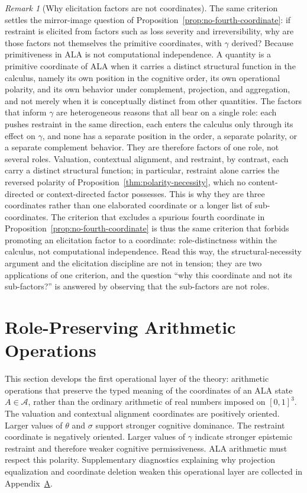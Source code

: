 \documentclass[reqno,final]{amsart}
\theoremstyle{definition}
\theoremstyle{plain}
\theoremstyle{remark}
\newtheorem{remark}{Remark}
\providecommand{\cA}{\mathcal{A}}
\begin{document}
\begin{remark}[Why elicitation factors are not coordinates]
\label{rem:factors-not-coordinates}
The same criterion settles the mirror-image question of Proposition~\ref{prop:no-fourth-coordinate}: if restraint is elicited from factors such as loss severity and irreversibility, why are those factors not themselves the primitive coordinates, with \(\gamma\) derived? Because primitiveness in ALA is not computational independence. A quantity is a primitive coordinate of ALA when it carries a distinct structural function in the calculus, namely its own position in the cognitive order, its own operational polarity, and its own behavior under complement, projection, and aggregation, and not merely when it is conceptually distinct from other quantities. The factors that inform \(\gamma\) are heterogeneous reasons that all bear on a single role: each pushes restraint in the same direction, each enters the calculus only through its effect on \(\gamma\), and none has a separate position in the order, a separate polarity, or a separate complement behavior. They are therefore factors of one role, not several roles. Valuation, contextual alignment, and restraint, by contrast, each carry a distinct structural function; in particular, restraint alone carries the reversed polarity of Proposition~\ref{thm:polarity-necessity}, which no content-directed or context-directed factor possesses. This is why they are three coordinates rather than one elaborated coordinate or a longer list of sub-coordinates. The criterion that excludes a spurious fourth coordinate in Proposition~\ref{prop:no-fourth-coordinate} is thus the same criterion that forbids promoting an elicitation factor to a coordinate: role-distinctness within the calculus, not computational independence. Read this way, the structural-necessity argument and the elicitation discipline are not in tension; they are two applications of one criterion, and the question ``why this coordinate and not its sub-factors?'' is answered by observing that the sub-factors are not roles.
\end{remark}

\section{Role-Preserving Arithmetic Operations}
\label{sec:arithmetic}
\label{sec:arithmetic-core}

This section develops the first operational layer of the theory: arithmetic operations that preserve the typed meaning of the coordinates of an ALA state \(A\in\cA\), rather than the ordinary arithmetic of real numbers imposed on \([0,1]^3\). The valuation and contextual alignment coordinates are positively oriented. Larger values of \(\theta\) and \(\sigma\) support stronger cognitive dominance. The restraint coordinate is negatively oriented. Larger values of \(\gamma\) indicate stronger epistemic restraint and therefore weaker cognitive permissiveness. ALA arithmetic must respect this polarity. Supplementary diagnostics explaining why projection equalization and coordinate deletion weaken this operational layer are collected in Appendix~\hyperref[app:diagnostic-details]{A}.
\end{document}
